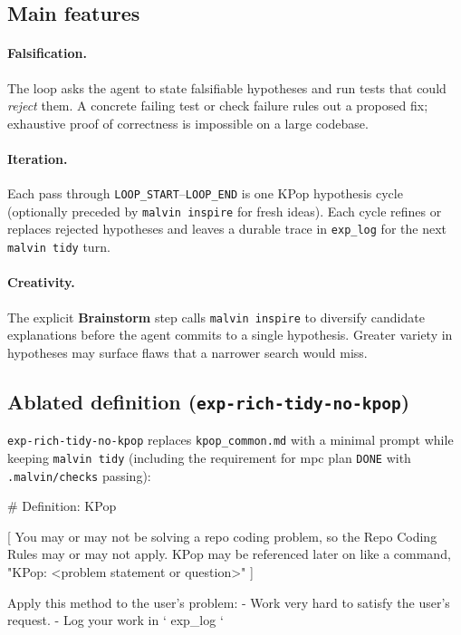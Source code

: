 \documentclass[11pt]{article}
\begin{document}
\subsection{Main features}

\paragraph{Falsification.}
The loop asks the agent to state falsifiable hypotheses and run tests that could \emph{reject} them. A concrete failing test or check failure rules out a proposed fix; exhaustive proof of correctness is impossible on a large codebase.

\paragraph{Iteration.}
Each pass through \texttt{LOOP\_START}--\texttt{LOOP\_END} is one KPop hypothesis cycle (optionally preceded by \texttt{malvin inspire} for fresh ideas). Each cycle refines or replaces rejected hypotheses and leaves a durable trace in \texttt{exp\_log} for the next \texttt{malvin tidy} turn.

\paragraph{Creativity.}
The explicit \textbf{Brainstorm} step calls \texttt{malvin inspire} to diversify candidate explanations before the agent commits to a single hypothesis. Greater variety in hypotheses may surface flaws that a narrower search would miss.

\subsection{Ablated definition (\texttt{exp-rich-tidy-no-kpop})}

\texttt{exp-rich-tidy-no-kpop} replaces \texttt{kpop\_common.md} with a minimal prompt while keeping \texttt{malvin tidy} (including the requirement for mpc plan \texttt{DONE} with \texttt{.malvin/checks} passing):

\begin{kpopdef}
# Definition: KPop

[
You may or may not be solving a repo coding problem, so the Repo Coding Rules may or may not apply.
KPop may be referenced later on like a command, "KPop: <problem statement or question>"
]

Apply this method to the user's problem:
- Work very hard to satisfy the user's request.
- Log your work in `{{ exp_log }}`
\end{kpopdef}
\end{document}
